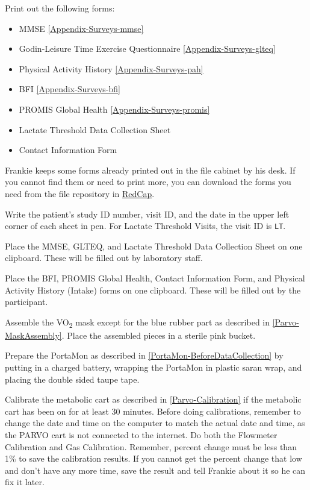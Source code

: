 \documentclass[
]{book}
\providecommand{\tightlist}{%
  \setlength{\itemsep}{0pt}\setlength{\parskip}{0pt}}
\begin{document}
Print out the following forms:

\begin{itemize}
\tightlist
\item
  MMSE \ref{Appendix-Surveys-mmse}
\item
  Godin-Leisure Time Exercise Questionnaire \ref{Appendix-Surveys-glteq}
\item
  Physical Activity History \ref{Appendix-Surveys-pah}
\item
  BFI \ref{Appendix-Surveys-bfi}
\item
  PROMIS Global Health \ref{Appendix-Surveys-promis}
\item
  Lactate Threshold Data Collection Sheet
\item
  Contact Information Form
\end{itemize}

Frankie keeps some forms already printed out in the file cabinet by his desk. If you cannot find them or need to print more, you can download the forms you need from the file repository in \href{https://redcap.prismahealth.org}{RedCap}.

Write the patient's study ID number, visit ID, and the date in the upper left corner of each sheet in pen. For Lactate Threshold Visits, the visit ID is \texttt{LT}.

Place the MMSE, GLTEQ, and Lactate Threshold Data Collection Sheet on one clipboard. These will be filled out by laboratory staff.

Place the BFI, PROMIS Global Health, Contact Information Form, and Physical Activity History (Intake) forms on one clipboard. These will be filled out by the participant.

Assemble the VO\textsubscript{2} mask except for the blue rubber part as described in \ref{Parvo-MaskAssembly}. Place the assembled pieces in a sterile pink bucket.

Prepare the PortaMon as described in \ref{PortaMon-BeforeDataCollection} by putting in a charged battery, wrapping the PortaMon in plastic saran wrap, and placing the double sided taupe tape.

Calibrate the metabolic cart as described in \ref{Parvo-Calibration} if the metabolic cart has been on for at least 30 minutes. Before doing calibrations, remember to change the date and time on the computer to match the actual date and time, as the PARVO cart is not connected to the internet. Do both the Flowmeter Calibration and Gas Calibration. Remember, percent change must be less than 1\% to save the calibration results. If you cannot get the percent change that low and don't have any more time, save the result and tell Frankie about it so he can fix it later.
\end{document}

